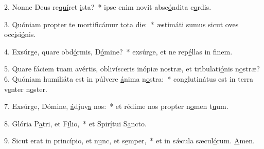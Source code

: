 2. Nonne Deus re\uline{quí}ret \uline{i}sta?~* ipse enim novit absc\uline{ó}ndita c\uline{o}rdis.\par 
3. Quóniam propter te mortificámur t\uline{o}ta d\uline{i}e:~* æstimáti sumus sicut oves occ\uline{i}si\uline{ó}nis.\par 
4. Exsúrge, quare obd\uline{ó}rmis, D\uline{ó}mine?~* exsúrge, et ne rep\uline{é}llas in f\uline{i}nem.\par 
5. Quare fáciem tuam avértis, oblivísceris inópiæ nostræ, et tribulati\uline{ó}nis n\uline{o}stræ?
6. Quóniam humiliáta est in púlvere \uline{á}nima n\uline{o}stra:~* conglutinátus est in terra v\uline{e}nter n\uline{o}ster.\par 
7. Exsúrge, Dómine, \uline{á}djuv\uline{a} nos:~* et rédime nos propter n\uline{o}men t\uline{u}um.\par 
8. Glória P\uline{a}tri, et F\uline{í}lio,~* et Spir\uline{í}tui S\uline{a}ncto.\par 
9. Sicut erat in princípio, et n\uline{u}nc, et s\uline{e}mper,~* et in sǽcula sæcul\uline{ó}rum. \uline{A}men.\par 
